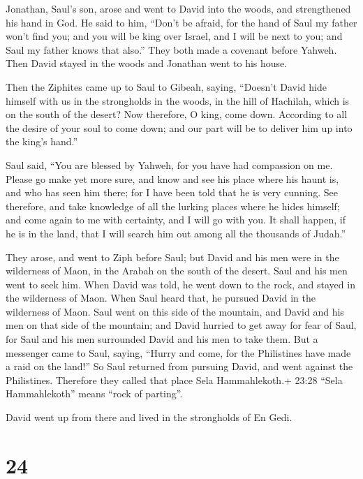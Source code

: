  Jonathan, Saul's son, arose and went to David into the
woods, and strengthened his hand in God.  He said to him,
``Don't be afraid, for the hand of Saul my father won't find you; and
you will be king over Israel, and I will be next to you; and Saul my
father knows that also.''  They both made a covenant before
Yahweh. Then David stayed in the woods and Jonathan went to his house.

 Then the Ziphites came up to Saul to Gibeah, saying,
``Doesn't David hide himself with us in the strongholds in the woods, in
the hill of Hachilah, which is on the south of the desert? 
Now therefore, O king, come down. According to all the desire of your
soul to come down; and our part will be to deliver him up into the
king's hand.''

 Saul said, ``You are blessed by Yahweh, for you have had
compassion on me.  Please go make yet more sure, and know
and see his place where his haunt is, and who has seen him there; for I
have been told that he is very cunning.  See therefore, and
take knowledge of all the lurking places where he hides himself; and
come again to me with certainty, and I will go with you. It shall
happen, if he is in the land, that I will search him out among all the
thousands of Judah.''

 They arose, and went to Ziph before Saul; but David and
his men were in the wilderness of Maon, in the Arabah on the south of
the desert.  Saul and his men went to seek him. When David
was told, he went down to the rock, and stayed in the wilderness of
Maon. When Saul heard that, he pursued David in the wilderness of Maon.
 Saul went on this side of the mountain, and David and his
men on that side of the mountain; and David hurried to get away for fear
of Saul, for Saul and his men surrounded David and his men to take them.
 But a messenger came to Saul, saying, ``Hurry and come,
for the Philistines have made a raid on the land!''  So
Saul returned from pursuing David, and went against the Philistines.
Therefore they called that place Sela Hammahlekoth.+ 23:28 ``Sela
Hammahlekoth'' means ``rock of parting''.

 David went up from there and lived in the strongholds of
En Gedi.

\hypertarget{section-23}{%
\section{24}\label{section-23}}

